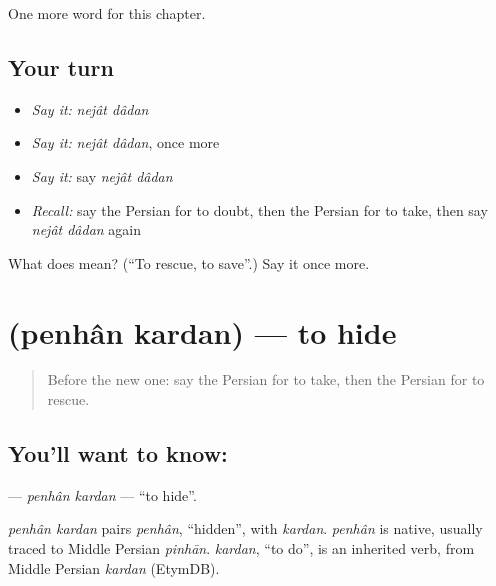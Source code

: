 \begin{grammarlens}[title={What you've built}]
One more word for this chapter.
\end{grammarlens}

\subsection*{Your turn}
\begin{itemize}
\raggedright
  \item \emph{Say it:} \emph{nejât dâdan}
  \item \emph{Say it:} \emph{nejât dâdan}, once more
  \item \emph{Say it:} say \emph{nejât dâdan}
  \item \emph{Recall:} say the Persian for to doubt, then the Persian for to take, then say \emph{nejât dâdan} again
\end{itemize}

\begin{tcolorbox}[breakable,colback=teal!4,colframe=teal!35!black,title={Before you move on}]
What does   mean? (\textquotedblleft{}To rescue, to save\textquotedblright{}.) Say it once more.
\end{tcolorbox}
\section[\texorpdfstring{\fa{پنهان} \fa{کردن} (penhân kardan)}{پنهان کردن (penhân kardan)}]{  (penhân kardan) — to hide}

\label{lesson:FA-C223-penhan-kardan}



\begin{quote}
Before the new one: say the Persian for to take, then the Persian for to rescue.
\end{quote}

\subsection*{You'll want to know:  }
\textbf{ } — \emph{penhân kardan} — \textquotedblleft{}to hide\textquotedblright{}.

\begin{cousinweb}
\emph{penhân kardan} pairs \emph{penhân}, \textquotedblleft{}hidden\textquotedblright{}, with \emph{kardan}. \emph{penhân} is native, usually traced to Middle Persian \emph{pinhān}. \emph{kardan}, \textquotedblleft{}to do\textquotedblright{}, is an inherited verb, from Middle Persian \emph{kardan} (EtymDB).
\end{cousinweb}

